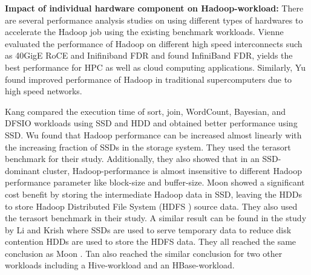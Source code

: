 \documentclass[conference]{IEEEtran}
\begin{document}

\textbf{Impact of individual hardware component on Hadoop-workload:}
There are several performance analysis studies on using different types of hardwares to accelerate the Hadoop job using the existing benchmark workloads.
Vienne \cite{ethib:vienne} evaluated the performance of Hadoop on different high speed interconnects such as 40GigE RoCE and Inifiniband FDR and found InfiniBand FDR, yields the best performance for HPC as well as cloud computing applications.
Similarly, Yu \cite{ethib:yu} found improved performance of Hadoop in traditional supercomputers due to high speed networks.

Kang \cite{ssdhdd:kang} compared the execution time of sort, join, WordCount, Bayesian, and DFSIO workloads using SSD and HDD and obtained better performance using SSD.
Wu \cite{ssdhdd:wu} found that Hadoop performance can be increased almost linearly with the increasing fraction of SSDs in the storage system. They used the terasort benchmark for their study. Additionally, they also showed that in an SSD-dominant cluster, Hadoop-performance is almost insensitive to different Hadoop performance parameter like block-size and buffer-size.
Moon \cite{ssdhdd:moon} showed a significant cost benefit by storing the intermediate Hadoop data in SSD, leaving the HDDs to store Hadoop Distributed File System (HDFS \cite{fw:hdfs}) source data. They also used the terasort benchmark in their study.
A similar result can be found in the study by Li \cite{ssdhdd:li} and Krish \cite{ssdhdd:krish} where SSDs are used to serve temporary data to reduce disk contention HDDs are used to store the HDFS data. They all reached the same conclusion as Moon \cite{ssdhdd:moon}.  
Tan \cite{ssdhdd:tan} also reached the similar conclusion for two other workloads including a Hive-workload and an HBase-workload.
\end{document}
